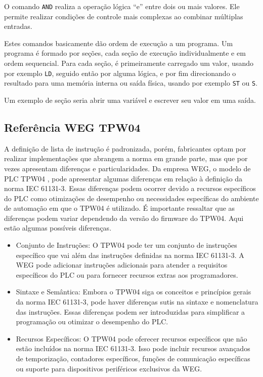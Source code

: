O comando \lstinline{AND} realiza a operação lógica ``e'' entre dois ou mais valores. Ele permite realizar condições de controle mais complexas ao combinar múltiplas entradas.

Estes comandos basicamente dão ordem de execução a um programa. Um programa é formado por seções, cada seção de execução individualmente e em ordem sequencial. Para cada seção, é primeiramente carregado um valor, usando por exemplo \lstinline{LD}, seguido então por alguma lógica, e por fim direcionando o resultado para uma memória interna ou saída física, usando por exemplo \lstinline{ST} ou \lstinline{S}.

Um exemplo de seção seria abrir uma variável e escrever seu valor em uma saída.



\subsection{Referência WEG TPW04}

A definição de lista de instrução é padronizada, porém, fabricantes optam por realizar implementações que abrangem a norma em grande parte, mas que por vezes apresentam diferenças e particularidades. Da empresa WEG, o modelo de PLC TPW04 \cite{wegtpw04}, pode apresentar algumas diferenças em relação à definição da norma IEC 61131-3. Essas diferenças podem ocorrer devido a recursos específicos do PLC como otimizações de desempenho ou necessidades específicas do ambiente de automação em que o TPW04 é utilizado. É importante ressaltar que as diferenças podem variar dependendo da versão do firmware do TPW04. Aqui estão algumas possíveis diferenças.

\begin{itemize}
	\item Conjunto de Instruções: O TPW04 pode ter um conjunto de instruções específico que vai além das instruções definidas na norma IEC 61131-3. A WEG pode adicionar instruções adicionais para atender a requisitos específicos do PLC ou para fornecer recursos extras aos programadores.

	\item Sintaxe e Semântica: Embora o TPW04 siga os conceitos e princípios gerais da norma IEC 61131-3, pode haver diferenças sutis na sintaxe e nomenclatura das instruções. Essas diferenças podem ser introduzidas para simplificar a programação ou otimizar o desempenho do PLC.

	\item Recursos Específicos: O TPW04 pode oferecer recursos específicos que não estão incluídos na norma IEC 61131-3. Isso pode incluir recursos avançados de temporização, contadores específicos, funções de comunicação específicas ou suporte para dispositivos periféricos exclusivos da WEG.
\end{itemize}

